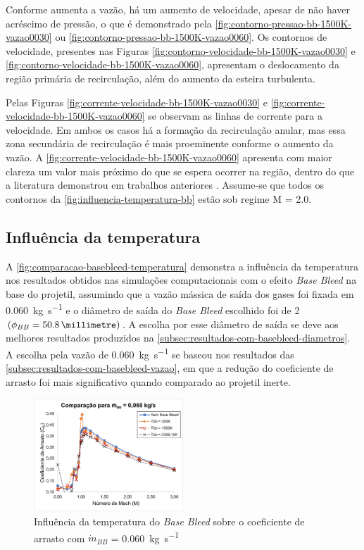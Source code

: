 Conforme aumenta a vazão, há um aumento de velocidade, apesar de não haver acréscimo de pressão, o que é demonstrado pela \autoref{fig:contorno-pressao-bb-1500K-vazao0030} ou \autoref{fig:contorno-pressao-bb-1500K-vazao0060}. Os contornos de velocidade, presentes nas Figuras \ref{fig:contorno-velocidade-bb-1500K-vazao0030} e \ref{fig:contorno-velocidade-bb-1500K-vazao0060}, apresentam o deslocamento da região primária de recirculação, além do aumento da esteira turbulenta. 

Pelas Figuras \ref{fig:corrente-velocidade-bb-1500K-vazao0030} e \ref{fig:corrente-velocidade-bb-1500K-vazao0060} se observam as linhas de corrente para a velocidade. Em ambos os casos há a formação da recirculação anular, mas essa zona secundária de recirculação é mais proeminente conforme o aumento da vazão. A \autoref{fig:corrente-velocidade-bb-1500K-vazao0060} apresenta com maior clareza um valor mais próximo do que se espera ocorrer na região, dentro do que a literatura demonstrou em trabalhos anteriores \cite{Sahu1985,Andersson1976}. Assume-se que todos os contornos da \autoref{fig:influencia-temperatura-bb} estão sob regime M = \num{2,0}.

\subsection{Influência da temperatura}

A \autoref{fig:comparacao-basebleed-temperatura} demonstra a influência da temperatura nos resultados obtidos nas simulações computacionais com o efeito \textit{Base Bleed} na base do projetil, assumindo que a vazão mássica de saída dos gases foi fixada em \qty{0,060}{\kilogram\per\second} e o diâmetro de saída do \textit{Base Bleed} escolhido foi de \qty{2}{\polegada} \(\left(\phi_{BB} = \qty{50,8}{\millimetre}\right)\). A escolha por esse diâmetro de saída se deve aos melhores resultados produzidos na \autoref{subsec:resultados-com-basebleed-diametros}. A escolha pela vazão de \qty{0,060}{\kilogram\per\second} se baseou nos resultados das \autoref{subsec:resultados-com-basebleed-vazao}, em que a redução do coeficiente de arrasto foi mais significativo quando comparado ao projetil inerte.

\begin{figure}[!ht]
	\centering
	\includegraphics[width=0.5\textwidth]{cd-combasebleed-vazao006-2pol.png}
	\caption{Influência da temperatura do \textit{Base Bleed} sobre o coeficiente de arrasto com \(\Dot{m}_{BB}\) = \qty{0,060}{\kilogram\per\second}}
	\label{fig:comparacao-basebleed-temperatura}
\end{figure}

